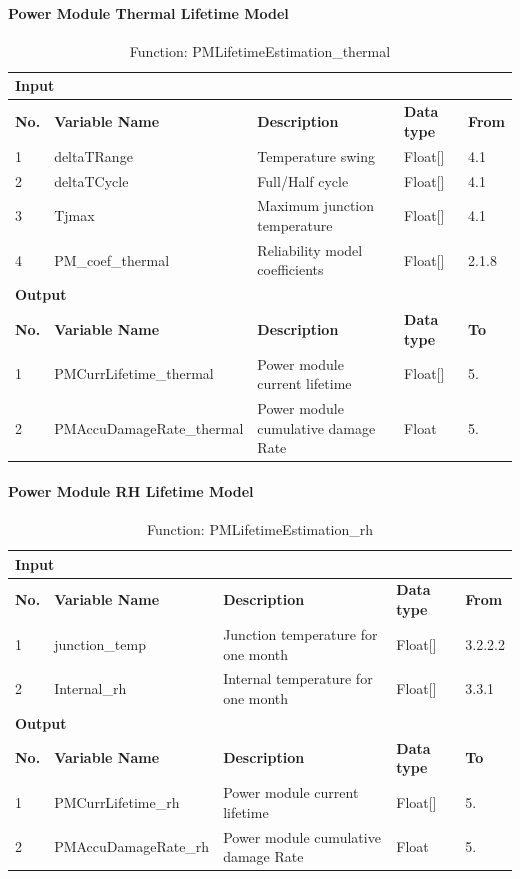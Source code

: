 \documentclass{article}
\begin{document}
\paragraph{Power Module Thermal Lifetime Model}
\begin{table}[h]
\centering
\caption{Function: PMLifetimeEstimation\_thermal}
\begin{tabular}{|l|l|l|l|l|}
\hline
\multicolumn{5}{|l|}{\textbf{Input}} \\ \hline
\textbf{No.} & \textbf{Variable Name} & \textbf{Description} & \textbf{Data type} & \textbf{From} \\ \hline
1 & deltaTRange & Temperature swing & Float[] & 4.1 \\ \hline
2 & deltaTCycle & Full/Half cycle & Float[] & 4.1 \\ \hline
3 & Tjmax & Maximum junction temperature & Float[] & 4.1 \\ \hline
4 & PM\_coef\_thermal & Reliability model coefficients & Float[] & 2.1.8 \\ \hline
\multicolumn{5}{|l|}{\textbf{Output}} \\ \hline
\textbf{No.} & \textbf{Variable Name} & \textbf{Description} & \textbf{Data type} & \textbf{To} \\ \hline
1 & PMCurrLifetime\_thermal & Power module current lifetime & Float[] & 5. \\ \hline
2 & PMAccuDamageRate\_thermal & Power module cumulative damage Rate & Float & 5. \\ \hline
\end{tabular}
\end{table}

\paragraph{Power Module RH Lifetime Model}
\begin{table}[h]
\centering
\caption{Function: PMLifetimeEstimation\_rh}
\begin{tabular}{|l|l|l|l|l|}
\hline
\multicolumn{5}{|l|}{\textbf{Input}} \\ \hline
\textbf{No.} & \textbf{Variable Name} & \textbf{Description} & \textbf{Data type} & \textbf{From} \\ \hline
1 & junction\_temp & Junction temperature for one month & Float[] & 3.2.2.2 \\ \hline
2 & Internal\_rh & Internal temperature for one month & Float[] & 3.3.1 \\ \hline
\multicolumn{5}{|l|}{\textbf{Output}} \\ \hline
\textbf{No.} & \textbf{Variable Name} & \textbf{Description} & \textbf{Data type} & \textbf{To} \\ \hline
1 & PMCurrLifetime\_rh & Power module current lifetime & Float[] & 5. \\ \hline
2 & PMAccuDamageRate\_rh & Power module cumulative damage Rate & Float & 5. \\ \hline
\end{tabular}
\end{table}
\end{document}
